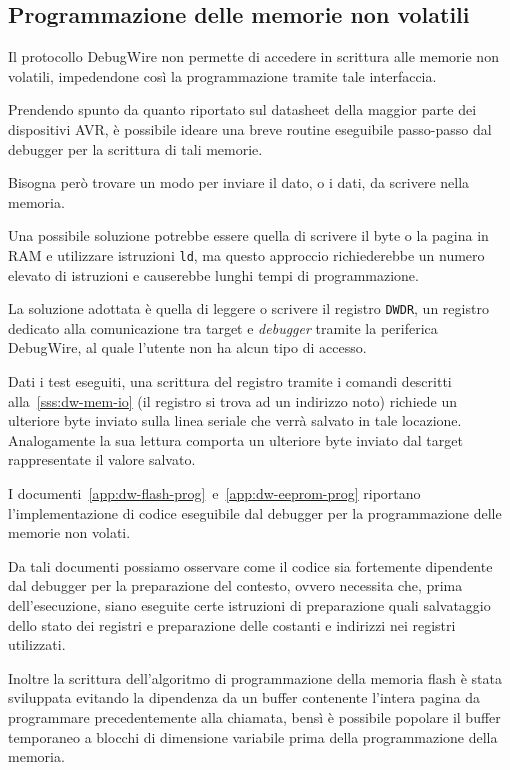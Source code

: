\subsection{Programmazione delle memorie non volatili}

Il protocollo DebugWire non permette di accedere in scrittura alle memorie non volatili, impedendone così la programmazione tramite tale interfaccia.

Prendendo spunto da quanto riportato sul datasheet della maggior parte dei dispositivi AVR\cite[34]{avr:m328p}\cite[sec 26.2.5]{avr:m328p}, è possibile ideare una breve routine eseguibile passo-passo dal debugger per la scrittura di tali memorie.

Bisogna però trovare un modo per inviare il dato, o i dati, da scrivere nella memoria.

Una possibile soluzione potrebbe essere quella di scrivere il byte o la pagina in RAM e utilizzare istruzioni \texttt{ld}, ma questo approccio richiederebbe un numero elevato di  istruzioni e causerebbe lunghi tempi di programmazione.

La soluzione adottata è quella di leggere o scrivere il registro \texttt{DWDR}, un registro dedicato alla comunicazione tra target e \textit{debugger} tramite la periferica DebugWire, al quale l'utente non ha alcun tipo di accesso.

Dati i test eseguiti, una scrittura del registro tramite i comandi descritti alla~\cref{sss:dw-mem-io} (il registro si trova ad un indirizzo noto) richiede un ulteriore byte inviato sulla linea seriale che verrà salvato in tale locazione\cite{site:dw-reverse-engeneering}. Analogamente la sua lettura comporta un ulteriore byte inviato dal target rappresentate il valore salvato\cite{site:dw-reverse-engeneering}.

I documenti~\ref{app:dw-flash-prog}~e~\ref{app:dw-eeprom-prog} riportano l'implementazione di codice eseguibile dal debugger per la programmazione delle memorie non volati.

Da tali documenti possiamo osservare come il codice sia fortemente dipendente dal debugger per la preparazione del contesto, ovvero necessita che, prima dell'esecuzione, siano eseguite certe istruzioni di preparazione quali salvataggio dello stato dei registri e preparazione delle costanti e indirizzi nei registri utilizzati.

Inoltre la scrittura dell'algoritmo di programmazione della memoria flash è stata sviluppata evitando la dipendenza da un buffer contenente l'intera pagina da programmare precedentemente alla chiamata, bensì è possibile popolare il buffer temporaneo a blocchi di dimensione variabile prima della programmazione della memoria.

